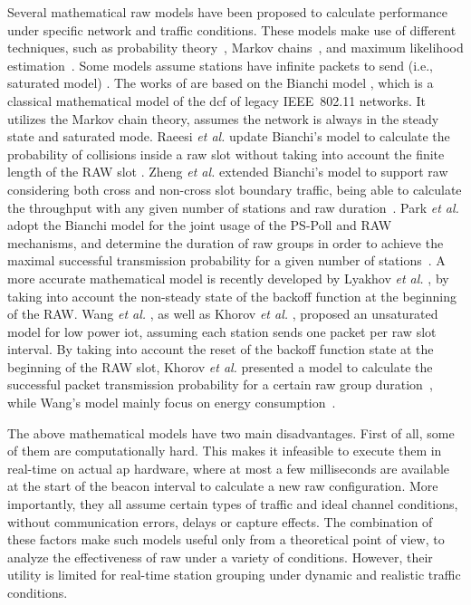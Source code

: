 Several mathematical \gls{raw} models have been proposed to calculate  performance under specific network and traffic conditions. These models make use of different techniques, such as probability theory~\cite{Wang2015}, Markov chains~\cite{Raeesi2014a, Khorov2015b,Zheng2014, Evgeny2018, Park2014b}, and maximum likelihood estimation~\cite{Park2014b}. Some models  assume stations have infinite packets to send (i.e., saturated model)  \cite{Raeesi2014a, Zheng2014, Park2014b, Evgeny2018}. The works of \cite{Raeesi2014a, Zheng2014, Park2014b} are based on the Bianchi model \cite{bianchi2000performance}, which is a classical mathematical model of the \gls{dcf} of legacy IEEE~802.11 networks. It utilizes the Markov chain theory, assumes the network is always in the steady state and saturated mode. Raeesi \textit{et al.}  update Bianchi's model to calculate the probability of collisions inside a \gls{raw} slot without taking into account the finite length of the RAW slot \cite{Raeesi2014a}. Zheng \textit{et al.} extended Bianchi's model to support \gls{raw} considering both cross and non-cross slot boundary traffic, being able to calculate the throughput with any given number of stations and \gls{raw} duration~\cite{Zheng2014}. Park \textit{et al.} adopt the Bianchi model for the  joint usage of the PS-Poll and RAW mechanisms, and determine the duration of \gls{raw} groups in order to achieve the maximal successful transmission probability for a given number of stations~\cite{Park2014b}. A more accurate mathematical model is recently developed by Lyakhov \textit{et al.} \cite{Evgeny2018}, by taking into account the non-steady state of the backoff function at the beginning of the RAW. Wang \textit{et al.} \cite{Wang2015} , as well as Khorov \textit{et al.}  \cite{Khorov2015b}, proposed an unsaturated model for low power \gls{iot}, assuming each station sends one packet per \gls{raw} slot interval. By taking into account the reset of the backoff function state at the beginning of the RAW slot, Khorov \textit{et al.} presented a model to calculate the successful packet transmission probability for a certain \gls{raw} group duration~\cite{Khorov2015b}, while Wang's model mainly focus on energy consumption~\cite{Wang2015}. 

The above mathematical models have two main disadvantages. First of all, some of them are computationally hard. This makes it infeasible to execute them in real-time on actual \gls{ap} hardware, where at most a few milliseconds are available at the start of the beacon interval to calculate a new \gls{raw} configuration. More importantly, they all assume certain types of traffic and ideal channel conditions, without communication errors, delays or capture effects. The combination of these factors make such models useful only from a theoretical point of view, to analyze the effectiveness of \gls{raw} under a variety of conditions. However, their utility is limited for real-time station grouping under dynamic and realistic traffic conditions. 

